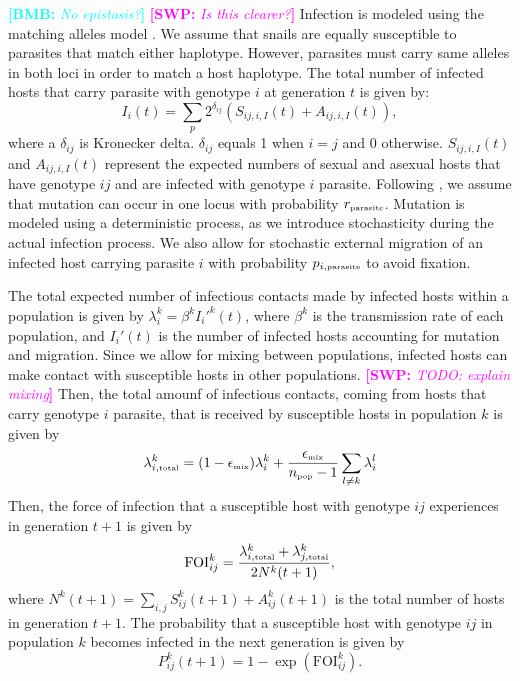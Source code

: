 \documentclass{article}\usepackage[]{graphicx}\usepackage[]{color}
\newcommand{\comment}[3]{\textcolor{#1}{\textbf{[#2: }\textit{#3}\textbf{]}}}
\newcommand{\bmb}[1]{\comment{cyan}{BMB}{#1}}
\newcommand{\swp}[1]{\comment{magenta}{SWP}{#1}}
\begin{document}
\bmb{No epistasis?}
\swp{Is this clearer?}
Infection is modeled using the matching alleles model \citep{otto1998evolution}.
We assume that snails are equally susceptible to parasites that match either haplotype.
However, parasites must carry same alleles in both loci in order to match a host haplotype.
The total number of infected hosts that carry parasite with genotype $i$ at generation $t$ is given by:
\begin{equation}
I_{i}(t) = \sum_{p} 2^{\delta_{ij}} \left( S_{ij,i,I}(t) + A_{ij,i,I}(t)\right),
\end{equation}
where a $\delta_{ij}$ is Kronecker delta.
$\delta_{ij}$ equals 1 when $i = j$ and 0 otherwise.
$S_{ij,i,I}(t)$ and $A_{ij,i,I}(t)$ represent the expected numbers of sexual and asexual hosts that have genotype $ij$ and are infected with genotype $i$ parasite. 
Following \cite{ashby2015diversity}, we assume that mutation can occur in one locus with probability $r_{\textrm{\tiny parasite}}$. 
Mutation is modeled using a deterministic process, as we introduce stochasticity during the actual infection process.
We also allow for stochastic external migration of an infected host carrying parasite $i$ with probability $p_{i, \textrm{\tiny parasite}}$ to avoid fixation.

The total expected number of infectious contacts made by infected hosts within a population is given by $\lambda_i^k = \beta^k {I_i'}^k(t)$, where $\beta^k$ is the transmission rate of each population, and $I_i'(t)$ is the number of infected hosts accounting for mutation and migration. 
Since we allow for mixing between populations, infected hosts can make contact with susceptible hosts in other populations. \swp{TODO: explain mixing}
Then, the total amounf of infectious contacts, coming from hosts that carry genotype $i$ parasite, that is received by susceptible hosts in population $k$ is given by
\begin{equation}
\lambda_{i, \textrm{\tiny total}}^k = (1 - \epsilon_{\textrm{\tiny mix}}) \lambda_i^k + \frac{\epsilon_{\textrm{\tiny mix}}}{n_\textrm{\tiny pop}-1} \sum_{l \neq k} \lambda_i^l
\end{equation}
Then, the force of infection that a susceptible host with genotype $ij$ experiences in generation $t+1$ is given by
\begin{equation}
\mathrm{FOI}_{ij}^k = \frac{\lambda_{i, \textrm{\tiny total}}^k  + \lambda_{j, \textrm{\tiny total}}^k}{2 N^k(t+1)},
\end{equation}
where $N^k(t+1) = \sum_{i,j} S_{ij}^k(t+1) + A_{ij}^k(t+1)$ is the total number of hosts in generation $t+1$.
The probability that a susceptible host with genotype $ij$ in population $k$ becomes infected in the next generation is given by
\begin{equation}
P_{ij}^k(t+1) = 1 - \exp\left(\mathrm{FOI}_{ij}^k\right).
\end{equation}
\end{document}
